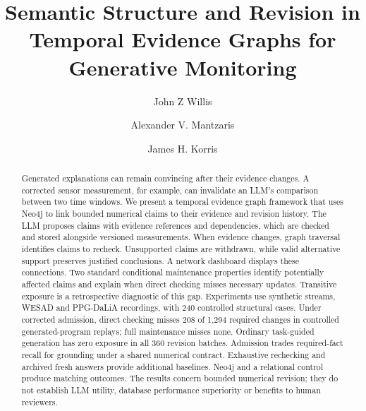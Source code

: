 \documentclass[runningheads]{llncs}
\begin{document}
\title{Semantic Structure and Revision in Temporal Evidence Graphs for Generative Monitoring}
\author{John Z Willis \and Alexander V. Mantzaris \and James H. Korris}
\maketitle
\begin{abstract}
Generated explanations can remain convincing after their evidence changes.
A corrected sensor measurement, for example, can invalidate an LLM's
comparison between two time windows. We present a temporal evidence graph
framework that uses Neo4j to link bounded numerical claims to their evidence
and revision history. The LLM proposes claims with evidence references and dependencies,
which are checked and stored alongside versioned measurements. When evidence
changes, graph traversal identifies claims to recheck. Unsupported claims
are withdrawn, while valid alternative support preserves justified
conclusions. A network dashboard displays these connections.
Two standard conditional maintenance properties identify potentially affected
claims and explain when direct checking misses necessary updates. Transitive
exposure is a retrospective diagnostic of this gap. Experiments use synthetic
streams, WESAD and PPG-DaLiA recordings, with 240 controlled structural cases.
Under corrected admission, direct checking misses 208 of 1,294 required changes
in controlled generated-program replays; full maintenance misses none.
Ordinary task-guided generation has zero exposure in all 360 revision batches.
Admission trades required-fact recall for grounding under a shared numerical
contract. Exhaustive rechecking and archived fresh answers provide additional
baselines. Neo4j and a relational control produce matching outcomes.
The results concern bounded numerical revision; they do not establish LLM
utility, database performance superiority or benefits to human reviewers.
\end{abstract}
\end{document}
